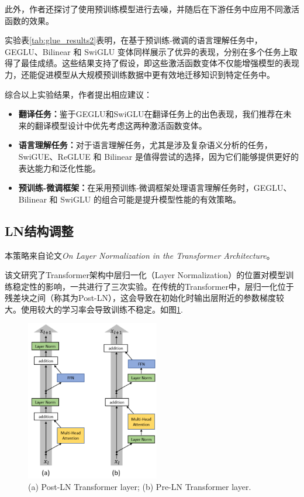     此外，作者还探讨了使用预训练模型进行去噪，并随后在下游任务中应用不同激活函数的效果。
    
    实验表\ref{tab:glue_results2}表明，在基于预训练-微调的语言理解任务中，GEGLU、Bilinear 和 SwiGLU 变体同样展示了优异的表现，分别在多个任务上取得了最佳成绩。这些结果支持了假设，即这些激活函数变体不仅能增强模型的表现力，还能促进模型从大规模预训练数据中更有效地迁移知识到特定任务中。
    
    
    综合以上实验结果，作者提出相应建议：
    \begin{itemize}
    	\item \textbf{翻译任务：}鉴于GEGLU和SwiGLU在翻译任务上的出色表现，我们推荐在未来的翻译模型设计中优先考虑这两种激活函数变体。
    	\item \textbf{语言理解任务：}对于语言理解任务，尤其是涉及复杂语义分析的任务，SwiGUE、ReGLUE 和 Bilinear 是值得尝试的选择，因为它们能够提供更好的表达能力和泛化性能。
    	\item \textbf{预训练-微调框架：}在采用预训练-微调框架处理语言理解任务时，GEGLU、Bilinear 和 SwiGLU 的组合可能是提升模型性能的有效策略。
    \end{itemize}
\subsection{LN结构调整}\label{sec-4:ln-adjust}
本策略来自论文\textit{On Layer Normalization in the Transformer Architecture}\citep{xiongLayerNormalizationTransformer2020}。

该文研究了Transformer架构中层归一化（Layer Normalization）的位置对模型训练稳定性的影响，一共进行了三次实验。在传统的Transformer中，层归一化位于残差块之间（称其为Post-LN），这会导致在初始化时输出层附近的参数梯度较大。使用较大的学习率会导致训练不稳定。如图\ref{fig:layer-structure}.

\begin{figure}[ht]
    \centering
    \includegraphics[height=7cm]{img/LN/LN-1.jpg}
    \caption{(a) Post-LN Transformer layer; (b) Pre-LN Transformer layer.}
    \label{fig:layer-structure}
\end{figure}

